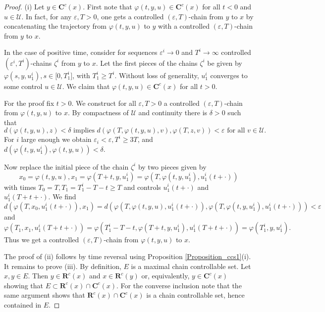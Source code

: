 \documentclass{siamltex}%
\begin{document}
\begin{proof}
(i) Let $y\in\mathbf{C}^{c}(x)$. First note that $\varphi(t,y,u)\in
\mathbf{C}^{c}(x)$ for all $t<0$ and $u\in\mathcal{U}$. In fact, for any
$\varepsilon,T>0$, one gets a controlled $\left(  \varepsilon,T\right)
$-chain from $y$ to $x$ by concatenating the trajectory from $\varphi(t,y,u)$
to $y$ with a controlled $\left(  \varepsilon,T\right)  $-chain from $y$ to
$x$.

In the case of positive time, consider for sequences $\varepsilon
^{i}\rightarrow0$ and $T^{i}\rightarrow\infty$ controlled $\left(
\varepsilon^{i},T^{i}\right)  $-chains $\zeta^{i}$ from $y$ to $x$. Let the
first pieces of the chains $\zeta^{i}$ be given by $\varphi(s,y,u_{1}%
^{i}),s\in\lbrack0,T_{1}^{i}]$, with $T_{1}^{i}\geq T^{i}$. Without loss of
generality, $u_{1}^{i}$ converges to some control $u\in\mathcal{U}$. We claim
that $\varphi(t,y,u)\in\mathbf{C}^{c}(x)$ for all $t>0$.

For the proof fix $t>0$. We construct for all $\varepsilon,T>0$ a controlled
$(\varepsilon,T)$-chain from $\varphi(t,y,u)$ to $x$. By compactness of
$\mathcal{U}$ and continuity there is $\delta>0$ such that%
\[
d(\varphi(t,y,u),z)<\delta\text{ implies }d(\varphi(T,\varphi
(t,y,u),v),\varphi(T,z,v))<\varepsilon\text{ for all }v\in\mathcal{U}.
\]
For $i$ large enough we obtain $\varepsilon_{i}<\varepsilon,T^{i}\geq3T$, and
$d(\varphi(t,y,u_{1}^{i}),\varphi(t,y,u))<\delta$.

Now replace the initial piece of the chain $\zeta^{i}$ by two pieces given by%
\[
x_{0}=\varphi(t,y,u),x_{1}=\varphi(T+t,y,u_{1}^{i})=\varphi(T,\varphi
(t,y,u_{1}^{i}),u_{1}^{i}(t+\cdot))
\]
with times $T_{0}=T,T_{1}=T_{1}^{i}-T-t\geq T$ and controls $u_{1}^{i}%
(t+\cdot)$ and $u_{1}^{i}(T+t+\cdot)$. We find%
\[
d(\varphi(T,x_{0},u_{1}^{i}(t+\cdot)),x_{1})=d(\varphi(T,\varphi
(t,y,u),u_{1}^{i}(t+\cdot)),\varphi(T,\varphi(t,y,u_{1}^{i}),u_{1}^{i}%
(t+\cdot)))<\varepsilon
\]
and
\[
\varphi(T_{1},x_{1},u_{1}^{i}(T+t+\cdot))=\varphi(T_{1}^{i}-T-t,\varphi
(T+t,y,u_{1}^{i}),u_{1}^{i}(T+t+\cdot))=\varphi(T_{1}^{i},y,u_{1}^{i}).
\]
Thus we get a controlled $(\varepsilon,T)$-chain from $\varphi(t,y,u)$ to $x$.

The proof of (ii) follows by time reversal using Proposition
\ref{Proposition_ccs1}(i). It remains to prove (iii). By definition, $E$ is a
maximal chain controllable set. Let $x,y\in E$. Then $y\in\mathbf{R}^{c}(x)$
and $x\in\mathbf{R}^{c}(y)$ or, equivalently, $y\in\mathbf{C}^{c}(x)$ showing
that $E\subset\mathbf{R}^{c}(x)\cap\mathbf{C}^{c}(x)$. For the converse
inclusion note that the same argument shows that $\mathbf{R}^{c}%
(x)\cap\mathbf{C}^{c}(x)$ is a chain controllable set, hence contained in $E$.


\end{proof}
\end{document}

